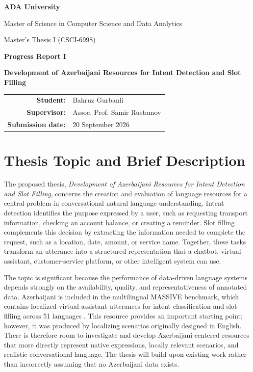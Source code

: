 \documentclass[12pt,a4paper]{article}
\begin{document}
\begin{titlepage}
    \centering
    {\Large \textbf{ADA University}\par}
    \vspace{0.4cm}
    {\large Master of Science in Computer Science and Data Analytics\par}
    \vfill
    {\large Master's Thesis I (CSCI-6998)\par}
    \vspace{0.8cm}
    {\LARGE \textbf{Progress Report I}\par}
    \vspace{1.2cm}
    {\Large \textbf{Development of Azerbaijani Resources for Intent Detection and Slot Filling}\par}
    \vfill
    \begin{tabular}{rl}
        \textbf{Student:} & Bahruz Gurbanli \\
        \textbf{Supervisor:} & Assoc. Prof. Samir Rustamov \\
        \textbf{Submission date:} & 20 September 2026
    \end{tabular}
    \vfill
\end{titlepage}

\section{Thesis Topic and Brief Description}

The proposed thesis, \textit{Development of Azerbaijani Resources for Intent Detection and Slot Filling}, concerns the creation and evaluation of language resources for a central problem in conversational natural language understanding. Intent detection identifies the purpose expressed by a user, such as requesting transport information, checking an account balance, or creating a reminder. Slot filling complements this decision by extracting the information needed to complete the request, such as a location, date, amount, or service name. Together, these tasks transform an utterance into a structured representation that a chatbot, virtual assistant, customer-service platform, or other intelligent system can use.

The topic is significant because the performance of data-driven language systems depends strongly on the availability, quality, and representativeness of annotated data. Azerbaijani is included in the multilingual MASSIVE benchmark, which contains localized virtual-assistant utterances for intent classification and slot filling across 51 languages \citep{fitzgerald2023massive}. This resource provides an important starting point; however, it was produced by localizing scenarios originally designed in English. There is therefore room to investigate and develop Azerbaijani-centered resources that more directly represent native expressions, locally relevant scenarios, and realistic conversational language. The thesis will build upon existing work rather than incorrectly assuming that no Azerbaijani data exists.
\end{document}
